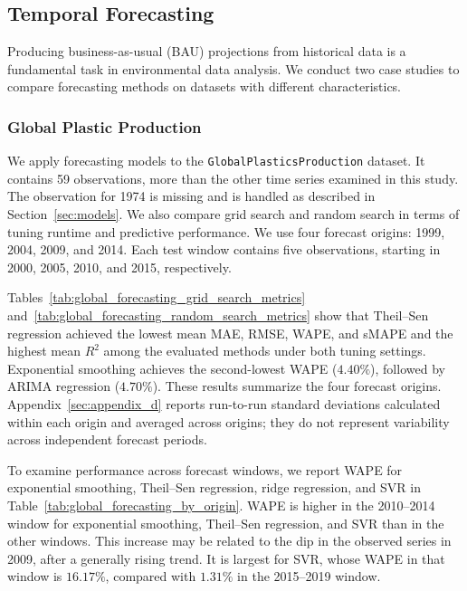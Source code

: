 \subsection{Temporal Forecasting}

Producing business-as-usual (BAU) projections from historical data is a fundamental task in environmental data analysis.
We conduct two case studies to compare forecasting methods on datasets with different characteristics.

\subsubsection{Global Plastic Production}

We apply forecasting models to the \texttt{GlobalPlasticsProduction} dataset.
It contains 59 observations, more than the other time series examined in this study.
The observation for 1974 is missing and is handled as described in Section~\ref{sec:models}.
We also compare grid search and random search in terms of tuning runtime and predictive performance.
We use four forecast origins: 1999, 2004, 2009, and 2014. Each test window contains five observations, starting in 2000, 2005, 2010, and 2015, respectively.

Tables~\ref{tab:global_forecasting_grid_search_metrics} and~\ref{tab:global_forecasting_random_search_metrics} show that Theil--Sen regression achieved the lowest mean MAE, RMSE, WAPE, and sMAPE and the highest mean \(R^2\) among the evaluated methods under both tuning settings. Exponential smoothing achieves the second-lowest WAPE (\(4.40\%\)), followed by ARIMA regression (\(4.70\%\)).
These results summarize the four forecast origins.
Appendix~\ref{sec:appendix_d} reports run-to-run standard deviations calculated within each origin and averaged across origins; they do not represent variability across independent forecast periods.




To examine performance across forecast windows, we report WAPE for exponential smoothing, Theil--Sen regression, ridge regression, and SVR in Table~\ref{tab:global_forecasting_by_origin}.
WAPE is higher in the 2010--2014 window for exponential smoothing, Theil--Sen regression, and SVR than in the other windows.
This increase may be related to the dip in the observed series in 2009, after a generally rising trend.
It is largest for SVR, whose WAPE in that window is \(16.17\%\), compared with \(1.31\%\) in the 2015--2019 window.

